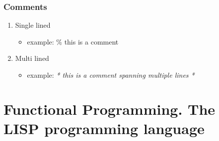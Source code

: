 \documentclass[11pt]{article}
\begin{document}
\subsubsection{Comments}
\label{sec:org796bd4d}
\begin{enumerate}
\item Single lined
\label{sec:orgd837998}
\begin{itemize}
\item example: \% this is a comment
\end{itemize}
\item Multi lined
\label{sec:org5722ffe}
\begin{itemize}
\item example: \emph{* this is a comment
spanning multiple lines *}
\end{itemize}
\end{enumerate}
\section{Functional Programming. The LISP programming language}
\label{sec:orgee3074d}
\end{document}
